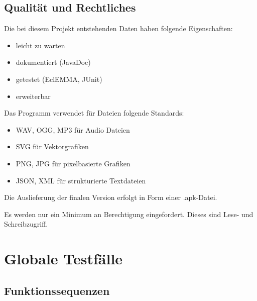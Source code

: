 \documentclass{scrartcl}
\begin{document}
\subsection{Qualität und Rechtliches}

\begin{nflist}[resume]
	\item Die bei diesem Projekt entstehenden Daten haben folgende Eigenschaften:
	\begin{itemize}
		\item leicht zu warten
		\item dokumentiert (JavaDoc)
		\item getestet (EclEMMA, JUnit)
		\item erweiterbar
	\end{itemize}
	\item Das Programm verwendet für Dateien folgende Standards: 
	\begin{itemize}
		\item WAV, OGG, MP3 für Audio Dateien 
		\item SVG für Vektorgrafiken
		\item PNG, JPG für pixelbasierte Grafiken
		\item JSON, XML für strukturierte Textdateien
	\end{itemize}
	\item Die Auslieferung der finalen Version erfolgt in Form einer .apk-Datei.
	\item Es werden nur ein Minimum an Berechtigung eingefordert. Dieses sind Lese- und Schreibzugriff.
\end{nflist}

\clearpage








\section{Globale Testfälle}

\subsection{Funktionssequenzen}
\end{document}
